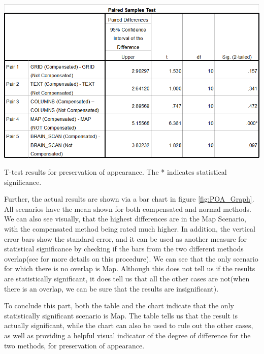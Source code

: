 \documentclass[]{article}
\begin{document}
\begin{table}[!h]
  \includegraphics[width=\linewidth]{figures/results/POA_Test.PNG}
  \caption{T-test results for preservation of appearance. The * indicates statistical significance.}
  \label{tabel:POA_Test}
\end{table}

Further, the actual results are shown via a bar chart in figure \ref{fig:POA_Graph}. All scenarios have the mean shown for both compensated and normal methods. We can also see visually, that the highest differences are in the Map Scenario, with the compensated method being rated much higher. In addition, the vertical error bars show the standard error, and it can be used as another measure for statistical significance by checking if the bars from the two different methods overlap(see \cite{error_bars} for more details on this procedure). We can see that the only scenario for which there is no overlap is Map. Although this does not tell us if the results are statistically significant, it does tell us that all the other cases are not(when there is an overlap, we can be sure that the results are insignificant).

To conclude this part, both the table and the chart indicate that the only statistically significant scenario is Map. The table tells us that the result is actually significant, while the chart can also be used to rule out the other cases, as well as providing a helpful visual indicator of the degree of difference for the two methods, for preservation of appearance.
\end{document}
